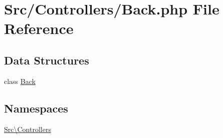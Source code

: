 \hypertarget{_back_8php}{}\section{Src/\+Controllers/\+Back.php File Reference}
\label{_back_8php}
\subsection*{Data Structures}
\begin{DoxyCompactItemize}
\item 
class \hyperlink{class_src_1_1_controllers_1_1_back}{Back}
\end{DoxyCompactItemize}
\subsection*{Namespaces}
\begin{DoxyCompactItemize}
\item 
 \hyperlink{namespace_src_1_1_controllers}{Src\textbackslash{}\+Controllers}
\end{DoxyCompactItemize}
